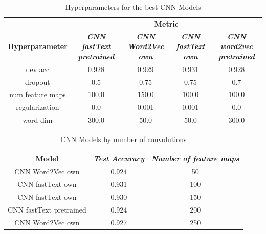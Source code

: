 \documentclass[conference]{IEEEtran}
\begin{document}
\begin{table}[htbp]
\caption{Hyperparameters for the best CNN Models}
\begin{center}
\begin{tabular}{|c|c|c|c|c|}
\hline
\textbf{}&\multicolumn{4}{|c|}{\textbf{Metric}} \\ 
\cline{2-5}
\textbf{Hyperparameter} & \textbf{\textit{CNN fastText pretrained}}& \textbf{\textit{CNN Word2Vec own}}& \textbf{\textit{CNN fastText own}}& \textbf{\textit{CNN word2vec pretrained}} \\ 
\hline
dev acc & 0.928 & 0.929 & 0.931 & 0.928 \\ 
\hline
dropout & 0.5 & 0.75 & 0.75 & 0.7 \\ 
\hline
num feature maps & 100.0 & 150.0 & 100.0 & 100.0 \\ 
\hline
regularization & 0.0 & 0.001 & 0.001 & 0.0 \\ 
\hline
word dim & 300.0 & 50.0 & 50.0 & 300.0 \\ 
\hline
\end{tabular}
\label{taba4}
\end{center}
\end{table}

\begin{table}[htbp]
\caption{CNN Models by number of convolutions}
\begin{center}
\begin{tabular}{|c|c|c|}
\hline
\textbf{}&\multicolumn{2}{|c|}{\textbf{}} \\ 
\cline{2-3}
\textbf{Model} & \textbf{\textit{Test Accuracy}}& \textbf{\textit{Number of feature maps}} \\ 
\hline
CNN Word2Vec own & 0.924 & 50 \\ 
\hline
CNN fastText own & 0.931 & 100 \\ 
\hline
CNN fastText own & 0.930& 150 \\ 
\hline
CNN fastText pretrained & 0.924 & 200 \\ 
\hline
CNN Word2Vec own & 0.927 & 250 \\ 
\hline
\end{tabular}
\label{tabfmaps}
\end{center}
\end{table}
\end{document}
